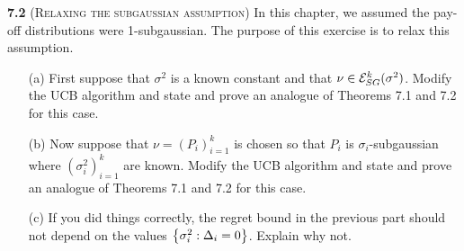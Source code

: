 \noindent\textbf{7.2} (\textsc{Relaxing the subgaussian assumption}) In this chapter, we assumed the pay-off distributions were 1-subgaussian. The purpose of this exercise is to relax this assumption. 
\begin{enumerate}
    \item[(a)] First suppose that $\sigma^2$ is a known constant and that $\nu \in \mathcal{E}_{SG}^k (\sigma^2)$. Modify the UCB algorithm and state and prove an analogue of Theorems 7.1 and 7.2 for this case.
    \item[(b)] Now suppose that $\nu =(P_i)_{i=1}^k $ is chosen so that $P_i$ is $\sigma_i$-subgaussian where $(\sigma_i^2)_{i=1}^k$ are known. Modify the UCB algorithm and state and prove an analogue of Theorems 7.1 and 7.2 for this case.
    \item[(c)] If you did things correctly, the regret bound in the previous part should not depend on the values $\left\{ \sigma_i^2:\Delta_i=0 \right\}$. Explain why not.
\end{enumerate}

